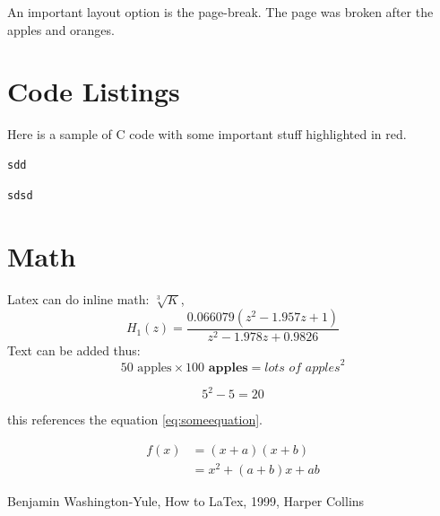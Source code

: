 \documentclass[a4paper, 12pt]{article}
\begin{document}
An important layout option is the page-break. The page was broken after the apples and oranges.

\section{Code Listings}
Here is a sample of C code with some important stuff highlighted in red.

\begin{lstlisting}[caption=csddaption, label=something]
sdd
\end{lstlisting}

\begin{lstlisting}[caption=blabla, label=amb]
sdsd
\end{lstlisting}

% 
% 	

\section{Math}
Latex can do inline math: $\sqrt[3]{K}$, 
\begin{equation}
H_{1}(z) = \frac{0.066079\left(z^2 - 1.957z + 1\right)}{z^2 - 1.978z + 0.9826}
\end{equation}
Text can be added thus:
$$50 \textrm{ apples} \times 100 \textbf{ apples} = \textit{lots of apples}^2$$

\begin{equation} \label{eq:someequation}
5^2 - 5 = 20
\end{equation}

this references the equation \ref{eq:someequation}.

\begin{align*}
 f(x) &= (x+a)(x+b) \\
 &= x^2 + (a+b)x + ab
\end{align*}

\begin{thebibliography}{99}
 Benjamin Washington-Yule, How to LaTex, 1999, Harper Collins
\end{thebibliography}
\end{document}
